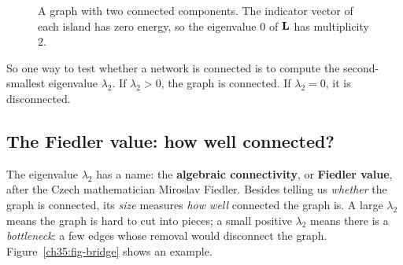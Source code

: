 \begin{figure}[htbp]
\centering
{}
\caption{A graph with two connected components. The indicator vector of each island has
zero energy, so the eigenvalue $0$ of $\mathbf{L}$ has multiplicity $2$.}
\label{ch35:fig-islands}
\end{figure}

So one way to test whether a network is connected is to compute the second-smallest
eigenvalue $\lambda_2$. If $\lambda_2 > 0$, the graph is connected. If $\lambda_2 = 0$, it
is disconnected.

\subsection{The Fiedler value: how well connected?}

The eigenvalue $\lambda_2$ has a name: the \textbf{algebraic connectivity}, or
\textbf{Fiedler value}, after the Czech mathematician Miroslav Fiedler. Besides telling us
\emph{whether} the graph is connected, its \emph{size} measures \emph{how well} connected
the graph is. A large $\lambda_2$ means the graph is hard to cut into pieces; a small
positive $\lambda_2$ means there is a \emph{bottleneck}: a few edges whose removal would
disconnect the graph. Figure~\ref{ch35:fig-bridge} shows an example.

